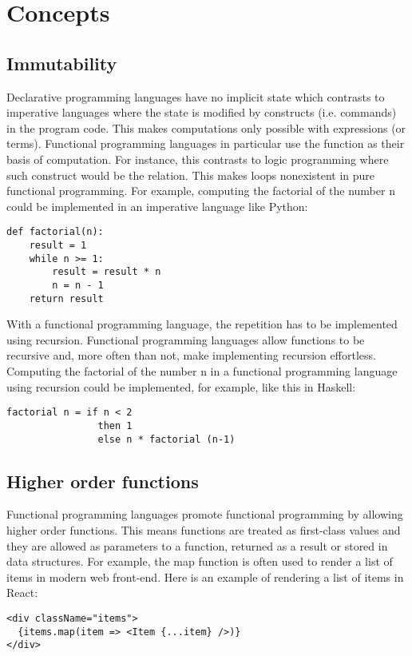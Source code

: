 \section{Concepts}

\subsection{Immutability}
Declarative programming languages have no implicit state which contrasts to imperative languages where the state is
modified by constructs (i.e. commands) in the program code. This makes computations only possible with expressions (or
terms). Functional programming languages in particular use the function as their basis of computation. For instance,
this contrasts to logic programming where such construct would be the relation. This makes loops nonexistent in pure
functional programming. For example, computing the factorial of the number n could be implemented in an imperative
language like Python:
\begin{verbatim}
def factorial(n):
    result = 1
    while n >= 1:
        result = result * n
        n = n - 1
    return result
\end{verbatim}
With a functional programming language, the repetition has to be implemented using recursion. Functional programming
languages allow functions to be recursive and, more often than not, make implementing recursion effortless. Computing
the factorial of the number n in a functional programming language using recursion could be implemented, for example,
like this in Haskell:
\begin{verbatim}
factorial n = if n < 2
                then 1
                else n * factorial (n-1)
\end{verbatim}
\cite{hudak}

\subsection{Higher order functions}
Functional programming languages promote functional programming by allowing higher order functions. This means functions
are treated as first-class values and they are allowed as parameters to a function, returned as a result or stored in
data structures.\cite{hudak} For example, the map function is often used to render a list of items in modern web
front-end.\cite{functionalreact} Here is an example of rendering a list of items in React:
\begin{verbatim}
<div className="items">
  {items.map(item => <Item {...item} />)}
</div>
\end{verbatim}

